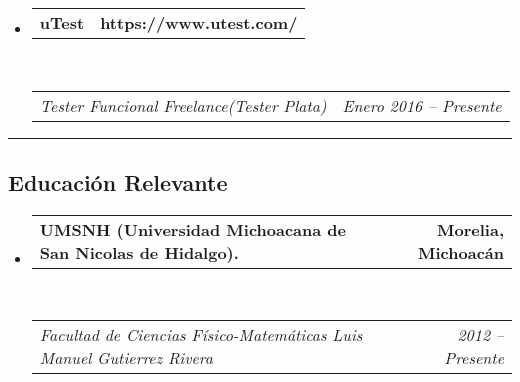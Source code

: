 \documentclass[10pt,letterpaper]{article}
\makeatletter
\newcommand{\headerrow}[2]
{\begin{tabular*}{\linewidth}{l@{\extracolsep{\fill}}r}
	#1 &
	#2 \\
\end{tabular*}}
\makeatother
\begin{document}
\begin{itemize}
    \item
	\headerrow
		{\textbf{uTest}}
		{\textbf{https://www.utest.com/}}
	\\
	\headerrow
		{\emph{Tester Funcional Freelance(Tester Plata)}}
		{\emph{Enero 2016 -- Presente}}

\end{itemize}


\hrule
\vspace{-0.4em}
\subsection*{Educación Relevante}

\begin{itemize}
	\parskip=0.1em

	\item 
	\headerrow
		{\textbf{UMSNH (Universidad Michoacana de San Nicolas de Hidalgo).}}
		{\textbf{Morelia, Michoacán}}
	\\
	\headerrow
		{\emph{Facultad de Ciencias Físico-Matemáticas Luis Manuel Gutierrez Rivera}}
		{\emph{2012 -- Presente}}

\end{itemize}
\end{document}

